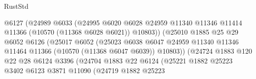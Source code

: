 \begin{lexlean}{RustStd}
\begin{coremodule}
                                      @6127
                                      (@24989
                                        @6033
                                        (@24995
                                          @6020
                                          @6028
                                          @24959
                                          @11340
                                          @11346
                                          @11414
                                          @11366
                                          (@10570 (@11368 @6028 @6021))
                                          @10803))
                                      (@25010
                                        @1885
                                        @25
                                        @29
                                        @6052
                                        @6126
                                        (@25017
                                          @6052
                                          (@25023
                                            @6038
                                            @6047
                                            @24959
                                            @11340
                                            @11346
                                            @11464
                                            @11366
                                            (@10570 (@11368 @6047 @6039))
                                            @10803))
                                        (@24724
                                          @1883
                                          @120
                                          @22
                                          @28
                                          @6124
                                          @3396
                                          (@24704
                                            @1883
                                            @22
                                            @6124
                                            (@25221
                                              @1882
                                              @25223
                                              @3402
                                              @6123
                                              @3871
                                              @11090
                                              (@24719
                                                @1882
                                                @25223

\end{coremodule}
\end{lexlean}

